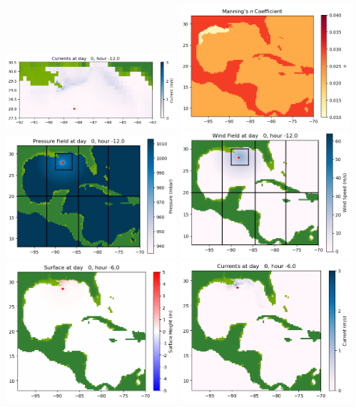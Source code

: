 \documentclass[11pt]{article}
\begin{document}
\includegraphics[width=0.475\textwidth]{frame0006fig1004.png}
\vskip 10pt 
\includegraphics[width=0.475\textwidth]{frame0006fig1005.png}
\includegraphics[width=0.475\textwidth]{frame0006fig1006.png}
\vskip 10pt 
\includegraphics[width=0.475\textwidth]{frame0006fig1007.png}
\vskip 10pt 
\includegraphics[width=0.475\textwidth]{frame0007fig1001.png}
\includegraphics[width=0.475\textwidth]{frame0007fig1002.png}
\end{document}
